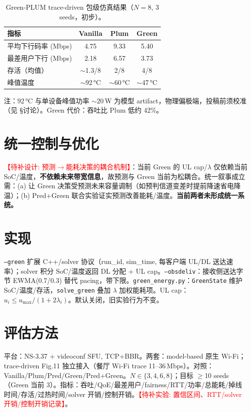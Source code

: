 \documentclass[journal,10pt]{IEEEtran}
\newcommand{\todoexp}[1]{\textcolor{red}{【待补实验: #1】}}
\newcommand{\tododesign}[1]{\textcolor{red}{【待补设计: #1】}}
\begin{document}
\begin{table}[ht]
\centering\small
\caption{Green-PLUM trace-driven 包级仿真结果（$N=8$, 3 seeds，初步）。}
\label{tab:green}
\begin{tabular}{lccc}
\toprule
指标 & Vanilla & Plum & Green \\
\midrule
平均下行码率 (Mbps) & 4.75 & 9.33 & 5.40 \\
最差用户下行 (Mbps) & 2.18 & 6.57 & 3.73 \\
存活（均值） & $\sim$1.3/8 & 2/8 & 4/8 \\
峰值温度 & $\sim$92\,°C & $\sim$60\,°C & $\sim$47\,°C \\
\bottomrule
\end{tabular}
\end{table}

\noindent 注：92\,°C 与单设备峰值功率 $\sim$20\,W 为模型 artifact，物理偏极端，投稿前须校准（见 §讨论）。Green 代价：吞吐比 Plum 低约 42\%。

\section{统一控制与优化}
\tododesign{预测$\to$能耗决策的耦合机制}：当前 Green 的 UL cap/$\lambda$ 仅依赖当前 SoC/温度，\textbf{不依赖未来带宽信息}，故预测与 Green 当前为松耦合。统一叙事成立需：(a) 让 Green 决策受预测未来容量调制（如预判信道变差时提前降速省电降温）；(b) Pred+Green 联合实验证实预测改善能耗/温度。\textbf{当前两者未形成统一系统。}

\section{实现}
\texttt{--green} 扩展 C++/solver 协议（run\_id, sim\_time, 每客户端 UL/DL 送达速率）；solver 积分 SoC/温度返回 DL 分配 + UL cap。\texttt{--obsdeliv}：接收侧送达字节 EWMA(0.7/0.3) 替代 pacing，带下限。\texttt{green\_energy.py}：\texttt{GreenState} 维护 SoC/温度/存活，\texttt{solve\_green} 叠加 $\lambda$ 加权能耗项。UL cap：$u_i\le u_{\text{max}}/(1+2\lambda_i)$。默认关闭，旧实验行为不变。

\section{评估方法}
平台：NS-3.37 + videoconf SFU, TCP+BBR。两套：model-based 原生 Wi-Fi；trace-driven Fig.11 独立接入（餐厅 Wi-Fi trace 11--36\,Mbps）。对照：Vanilla/Plum/Pred/Green/Pred+Green。$N\in\{3,4,6,8\}$；目标 $\geq$10 seeds（Green 当前 3）。指标：吞吐/QoE/最差用户/fairness/RTT/功率/总能耗/掉线时间/存活/过热时间/solver 开销/控制开销。\todoexp{置信区间、RTT/solver 开销/控制开销记录}。
\end{document}
